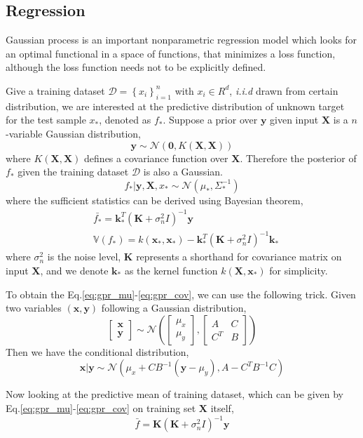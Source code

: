 \documentclass{article}
\newcommand{\vct}[1]{\ensuremath{\boldsymbol{#1}}} %
\newcommand{\set}[1]{\ensuremath{\mathcal{#1}}}
\newcommand{\bb}[1]{\ensuremath{\mathbb{#1}}}
\newcommand{\bmat}[1]{\begin{bmatrix}#1\end{bmatrix}}
\newcommand{\question}[1]{\textcolor{red}{Q: #1}}
\begin{document}
\subsection{Regression}
\label{sec:gpr}
Gaussian process is an important nonparametric regression model which looks for an optimal functional in a space of functions, that minimizes a loss function, although the loss function needs not to be explicitly defined. \cite{rw06gp}

Give a training dataset $\set D = \left\{x_i\right\}_{i=1}^n$ with $x_i \in R^d$, \textit{i.i.d} drawn from certain distribution, we are interested at the predictive distribution of unknown target for the  test sample $x_*$, denoted as $f_*$. Suppose a prior over $\vct y$ given input $\vct X$ is a $n$-variable Gaussian distribution,
\[
\vct y \sim \set N(\vct 0, K(\vct X, \vct X))
\]
where $K(\vct X, \vct X)$ defines a covariance function over $\vct X$. Therefore the posterior of $f_*$ given the training dataset $\set D$ is also a Gaussian.
\[
f_*|\vct y, \vct X, x_* \sim \set N(\mu_*, \Sigma_*^{-1})
\]
where the sufficient statistics can be derived using Bayesian theorem,
\begin{align}
	& \bar{f_*} = \vct k_{*}^T (\vct K +\sigma_n^2 I)^{-1}\vct y \label{eq:gpr_mu}\\
	& \bb{V}(f_*) = k(\vct x_*, \vct x_*) - \vct k_{*}^T (\vct K+\sigma_n^2 I)^{-1} \vct k_{*}  \label{eq:gpr_cov}
\end{align}
where $\sigma_n^2$ is the noise level, $\vct K$ represents a shorthand for covariance matrix on input $ \vct X $, and we denote $ \vct k_{*} $ as the kernel function $ k(\vct X, \vct x_*) $ for simplicity.

To obtain the Eq.\eqref{eq:gpr_mu}-\eqref{eq:gpr_cov}, we can use the following trick.
Given two variables $(\vct x, \vct y)$ following a Gaussian distribution,
\[
\bmat{\vct x\\ \vct y} \sim \set N\left(
\bmat{\mu_x \\ \mu_y}, \bmat{A & C \\ C^T & B}
\right)
\]
Then we have the conditional distribution,
\[
\vct x|\vct y \sim \set N\left(\mu_x+CB^{-1}(\vct y - \mu_y), A - C^TB^{-1}C \right)
\]

Now looking at the predictive mean of training dataset, which can be given by Eq.\eqref{eq:gpr_mu}-\eqref{eq:gpr_cov} on training set $ \vct X $ itself, 
\[ \bar{f} = \vct K(\vct K + \sigma_n^2 I)^{-1}\vct y \]
\end{document}
